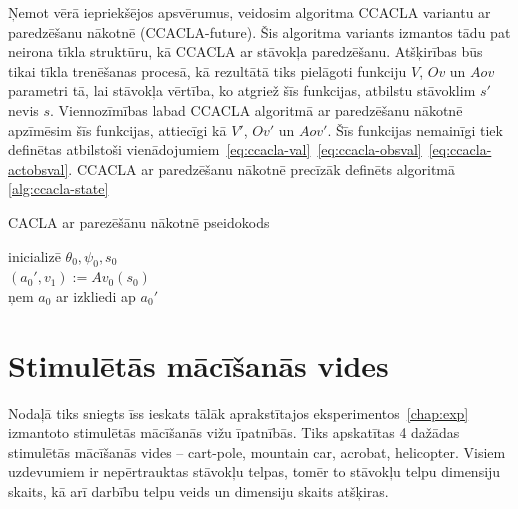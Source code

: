 \documentclass{ludis} %
\begin{document}
Ņemot vērā iepriekšējos apsvērumus, veidosim algoritma CCACLA variantu ar
paredzēšanu nākotnē (CCACLA-future). Šis algoritma variants izmantos tādu pat neirona tīkla
struktūru, kā CCACLA ar stāvokļa paredzēšanu. Atšķirības būs tikai tīkla
trenēšanas procesā, kā rezultātā tiks pielāgoti funkciju $V$, $Ov$ un $Aov$
parametri tā, lai stāvokļa vērtība, ko atgriež šīs funkcijas, atbilstu stāvoklim
$s'$ nevis $s$. Viennozīmības labad CCACLA algoritmā ar paredzēšanu nākotnē
apzīmēsim šīs funkcijas, attiecīgi kā $V'$, $Ov'$ un $Aov'$. Šīs funkcijas
nemainīgi tiek definētas atbilstoši
vienādojumiem~\eqref{eq:ccacla-val}~\eqref{eq:ccacla-obsval}~\eqref{eq:ccacla-actobsval}.
CCACLA ar paredzēšanu nākotnē precīzāk definēts algoritmā \ref{alg:ccacla-state}


\begin{spacing}{1}
\begin{algorithm}
\caption{CACLA ar parezēšānu nākotnē pseidokods}\label{alg:ccacla-future}
inicializē $\theta_0, \psi_0, s_0$ \\
$(a_0', v_1) := Av_0(s_0)$ \\
ņem $a_0$ ar izkliedi ap $a_0'$ \\
\end{algorithm}
\end{spacing}

\chapter{Stimulētās mācīšanās vides}
Nodaļā tiks sniegts īss ieskats tālāk aprakstītajos eksperimentos~\ref{chap:exp}
izmantoto stimulētās mācīšanās vižu īpatnībās. Tiks apskatītas 4 dažādas
stimulētās mācīšanās vides -- cart-pole, mountain car, acrobat, helicopter.
Visiem uzdevumiem ir nepērtrauktas stāvokļu telpas, tomēr to stāvokļu telpu
dimensiju skaits, kā arī darbību telpu veids un dimensiju skaits atšķiras.
\end{document}
